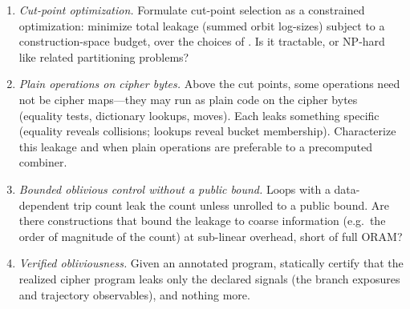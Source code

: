 \documentclass[11pt]{article}
\theoremstyle{definition}
\theoremstyle{plain}
\theoremstyle{remark}
\begin{document}
\begin{enumerate}
\item \emph{Cut-point optimization.}
  Formulate cut-point selection as a constrained optimization: minimize
  total leakage (summed orbit log-sizes) subject to a construction-space
  budget, over the choices of .
  Is it tractable, or NP-hard like related partitioning problems?

\item \emph{Plain operations on cipher bytes.}
  Above the cut points, some operations need not be cipher maps---they
  may run as plain code on the cipher bytes (equality tests, dictionary
  lookups, moves).
  Each leaks something specific (equality reveals collisions; lookups
  reveal bucket membership).
  Characterize this leakage and when plain operations are preferable to
  a precomputed combiner.

\item \emph{Bounded oblivious control without a public bound.}
  Loops with a data-dependent trip count leak the count unless unrolled
  to a public bound.
  Are there constructions that bound the leakage to coarse information
  (e.g.\ the order of magnitude of the count) at sub-linear overhead,
  short of full ORAM?

\item \emph{Verified obliviousness.}
  Given an annotated program, statically certify that the realized
  cipher program leaks only the declared signals (the branch exposures
  and trajectory observables), and nothing more.
\end{enumerate}




\end{document}
